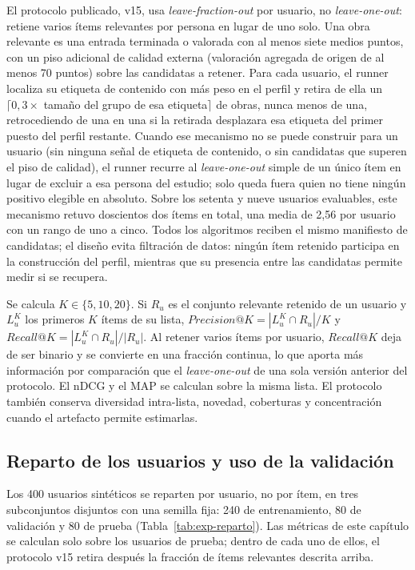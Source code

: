 El protocolo publicado, v15, usa \emph{leave-fraction-out} por usuario, no
\emph{leave-one-out}: retiene varios ítems relevantes por persona en lugar de uno solo. Una
obra relevante es una entrada terminada o valorada con al menos siete medios puntos, con un
piso adicional de calidad externa (valoración agregada de origen de al menos 70 puntos) sobre
las candidatas a retener. Para cada usuario, el runner localiza su etiqueta de contenido con
más peso en el perfil y retira de ella un \(\lceil 0{,}3\times\) tamaño del grupo de esa
etiqueta\(\rceil\) de obras, nunca menos de una, retrocediendo de una en una si la retirada
desplazara esa etiqueta del primer puesto del perfil restante. Cuando ese mecanismo no se
puede construir para un usuario (sin ninguna señal de etiqueta de contenido, o sin candidatas
que superen el piso de calidad), el runner recurre al \emph{leave-one-out} simple de un único
ítem en lugar de excluir a esa persona del estudio; solo queda fuera quien no tiene ningún
positivo elegible en absoluto. Sobre los setenta y nueve usuarios evaluables, este mecanismo
retuvo doscientos dos ítems en total, una media de 2{,}56 por usuario con un rango de uno a
cinco. Todos los algoritmos reciben el mismo manifiesto de candidatas; el diseño evita
filtración de datos: ningún ítem retenido participa en la construcción del perfil, mientras que su
presencia entre las candidatas permite medir si se recupera.

Se calcula \(K\in\{5,10,20\}\). Si \(R_u\) es el conjunto relevante retenido de un usuario y
\(L_u^K\) los primeros \(K\) ítems de su lista, \(Precision@K=|L_u^K\cap R_u|/K\) y
\(Recall@K=|L_u^K\cap R_u|/|R_u|\). Al retener varios ítems por usuario, \(Recall@K\) deja de
ser binario y se convierte en una fracción continua, lo que aporta más información por
comparación que el \emph{leave-one-out} de una sola versión anterior del protocolo. El nDCG
y el MAP se calculan sobre la misma
lista. El protocolo también conserva diversidad
intra-lista, novedad, coberturas y concentración cuando el artefacto permite estimarlas.

\subsection{Reparto de los usuarios y uso de la validación}\label{sec:exp-reparto}

Los 400 usuarios sintéticos se reparten por usuario, no por ítem, en tres subconjuntos disjuntos con una semilla
fija: 240 de entrenamiento, 80 de validación y 80 de prueba (Tabla~\ref{tab:exp-reparto}). Las métricas de este
capítulo se calculan solo sobre los usuarios de prueba; dentro de cada uno de ellos, el protocolo v15 retira después
la fracción de ítems relevantes descrita arriba.

